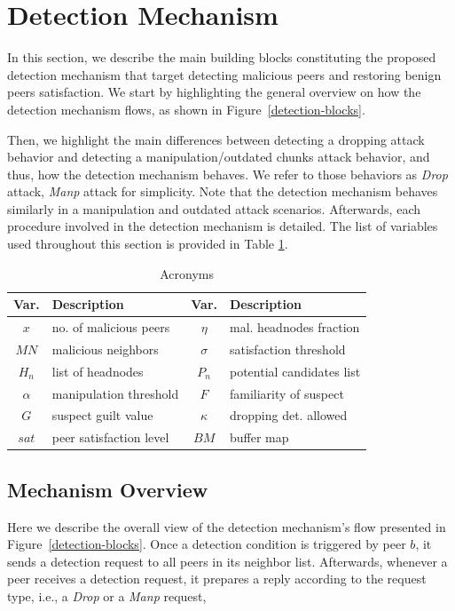 \section{Detection Mechanism}
\label{sec:detection}

In this section, we describe the main building blocks constituting the proposed detection mechanism that target detecting malicious peers and restoring benign peers satisfaction.
We start by highlighting the general overview on how the detection mechanism flows, as shown in Figure~\ref{detection-blocks}.

Then, we highlight the main differences between detecting a dropping attack behavior and detecting a manipulation/outdated chunks attack behavior, and thus, how the detection mechanism behaves.
We refer to those behaviors as \textit{Drop} attack, \textit{Manp} attack for simplicity. 
Note that the detection mechanism behaves similarly in a manipulation and outdated attack scenarios.
Afterwards, each procedure involved in the detection mechanism is detailed. 
The list of variables used throughout this section is provided in Table \ref{tab:acronyms}.

\begin{table}[ht]
\center
\caption{Acronyms}
\begin{tabular}{|c|l||c|l|}
\hline

\bf{Var.} & \bf{Description}  & \bf{Var.} & \bf{Description} \\\hline\hline
$x$ & no. of malicious peers & $\eta$ & mal. headnodes fraction\\\hline
$MN$ & malicious neighbors & $\sigma$ & satisfaction threshold\\\hline
$H_n$ & list of headnodes & $P_n$ & potential candidates list \\\hline
$\alpha$ & manipulation threshold& $F$ & familiarity of suspect \\\hline
$G$ & suspect guilt value & $\kappa$ & dropping det. allowed\\\hline
$sat$ & peer satisfaction level& $BM$ & buffer map\\\hline
\end{tabular}
\label{tab:acronyms}
\end{table}

\subsection{Mechanism Overview}
Here we describe the overall view of the detection mechanism's flow presented in Figure~\ref{detection-blocks}.
Once a detection condition is triggered by peer $b$, it sends a detection request to all peers in its neighbor list.
Afterwards, whenever a peer receives a detection request, it prepares a reply according to the request type, i.e., a \textit{Drop} or a \textit{Manp} request, 


